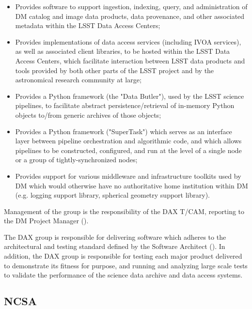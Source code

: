 \begin{itemize}

  \item{Provides software to support ingestion, indexing, query, and administration of DM catalog and image
  data products, data provenance, and other associated metadata within the LSST Data Access Centers;}

  \item{Provides implementations of data access services (including IVOA services), as well as associated
  client libraries, to be hosted within the LSST Data Access Centers, which facilitate interaction between
  LSST data products and tools provided by both other parts of the LSST project and by the astronomical
  research community at large;}

  \item{Provides a Python framework (the "Data Butler"), used by the LSST science pipelines, to facilitate
  abstract persistence/retrieval of in-memory Python objects to/from generic archives of those objects;}

  \item{Provides a Python framework ("SuperTask") which serves as an interface layer between pipeline
  orchestration and algorithmic code, and which allows pipelines to be constructed, configured, and run at
  the level of a single node or a group of tightly-synchronized nodes;}

  \item{Provides support for various middleware and infrastructure toolkits used by DM which would otherwise
  have no authoritative home institution within DM (e.g. logging support library, spherical geometry support
  library).}

\end{itemize}

Management of the group is the responsibility of the DAX T/CAM, reporting to the DM Project Manager
().

The DAX group is responsible for delivering software which adheres to the architectural and testing standard
defined by the Software Architect (). In addition, the DAX group is responsible for
testing each major product delivered to demonstrate its fitness for purpose, and running and analyzing large
scale tests to validate the performance of the science data archive and data access systems.

\subsection {NCSA\label{sect:ncsa}}
